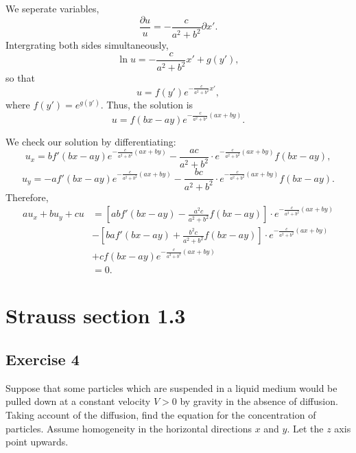 \documentclass{article}
\begin{document}
		We seperate variables, \[\frac{\partial u}{u}=-\frac{c}{a^2+b^2}\partial x'.\]
		Intergrating both sides simultaneously, \[\ln u = -\frac{c}{a^2+b^2}x' +g(y'),\] so that \[ u = f(y')e^{-\frac{c}{a^2+b^2}x'}, \]
		where $f(y')=e^{g(y')}$.
		Thus, the solution is  \[ u = f(bx-ay)e^{-\frac{c}{a^2+b^2}(ax+by)}.\]

		We check our solution by differentiating:
				\[u_x= b f'(bx-ay)e^{-\frac{c}{a^2+b^2}(ax+by)} -\frac{ac}{a^2+b^2} \cdot e^{-\frac{c}{a^2+b^2}(ax+by)}f(bx-ay),\]
				\[u_y= -a f'(bx-ay)e^{-\frac{c}{a^2+b^2}(ax+by)} -\frac{bc}{a^2+b^2} \cdot e^{-\frac{c}{a^2+b^2}(ax+by)}f(bx-ay).\]	
		Therefore,
		\begin{equation*}
			\begin{aligned}
				au_x+bu_y+cu&= 
				[ab f'(bx-ay) -\frac{a^2c}{a^2+b^2} f(bx-ay)]\cdot e^{-\frac{c}{a^2+b^2}(ax+by)}\\
				&-[b a f'(bx-ay)+\frac{b^2c}{a^2+b^2}  f(bx-ay)]\cdot e^{-\frac{c}{a^2+b^2}(ax+by)} \\
				& +cf(bx-ay)e^{-\frac{c}{a^2+b^2}(ax+by)} \\
				&=0.
			\end{aligned}
		\end{equation*}

\section{Strauss section 1.3}
\subsection{Exercise 4}
		Suppose that some particles which are
			suspended in a liquid medium would be pulled down
			at a constant velocity $V > 0$ by gravity in the
			absence of diffusion. Taking account of the
			diffusion, find the equation for the concentration
			of particles. Assume homogeneity in the horizontal
			directions $x$ and $y$. Let the $z$ axis point upwards.
\end{document}
